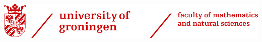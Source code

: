 \begin{titlepage}
    \begin{addmargin}[-1cm]{-3cm}
    \begin{center}
        \large  

        \hfill

        \includegraphics[width=1.3\textwidth]{gfx/rug_logo} \\ \medskip

        \vfill
        \vfill

        \begingroup
            \color{Maroon}\spacedallcaps{\myTitle} \\ \bigskip
        \endgroup

        \spacedlowsmallcaps{\myName}

        \vfill
        \vfill


        \mySubtitle \\ \medskip   
        \myDepartment \\                            
        \myFaculty \\
        \myUni \\ \bigskip

        \myTime\ %


    \end{center}  
  \end{addmargin}       
\end{titlepage}   